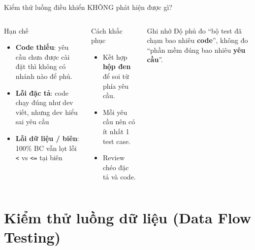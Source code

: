 \documentclass[aspectratio=169,12pt]{beamer}
\begin{document}
\begin{frame}[shrink=5]{Kiểm thử luồng điều khiển KHÔNG phát hiện được gì?}
  \begin{columns}[T]
    \begin{alertblock}{Hạn chế}
      \begin{itemize}
        \item \textbf{Code thiếu}: yêu cầu chưa được cài đặt thì
          không có nhánh nào để phủ.
        \item \textbf{Lỗi đặc tả}: code chạy đúng như dev viết,
          nhưng dev hiểu sai yêu cầu
        \item \textbf{Lỗi dữ liệu / biên}: 100\% BC vẫn lọt lỗi
          \texttt{<} vs \texttt{<=} tại biên
      \end{itemize}
    \end{alertblock}

    \begin{block}{Cách khắc phục}
      \begin{itemize}
        \item Kết hợp \textbf{hộp đen} để soi từ phía yêu cầu.
        \item Mỗi yêu cầu nên có ít nhất 1 test case.
        \item Review chéo đặc tả và code.
      \end{itemize}
    \end{block}

    \begin{exampleblock}{Ghi nhớ}
      Độ phủ đo ``bộ test đã chạm bao nhiêu \textbf{code}'',
      không đo ``phần mềm đúng bao nhiêu \textbf{yêu cầu}''.
    \end{exampleblock}
  \end{columns}
\end{frame}



\section{Kiểm thử luồng dữ liệu (Data Flow Testing)}
\end{document}
